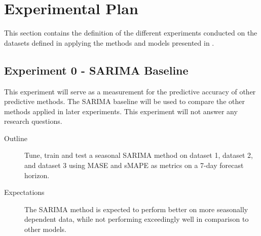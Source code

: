 
\section{Experimental Plan}
\label{section:Results:ExperimentalPlan}

This section contains the definition of the different experiments conducted on the datasets defined in 
applying the methods and models presented in .



\iffalse
  Trying and failing is a major part of research.
  However, to have a chance of success you need a plan driving the experimental research,
  just as you need a plan for your literature search.
  Further, plans are made to be revised and this revision ensures that any further decisions made are in line with the work already completed.

  The plan should include what experiments or series of experiments are planned and what question the individual or set of experiments aim to answer.
  Such questions should be connected to your research questions so that in the evaluation of your results you can discuss the results wrt to the research questions.
\fi


\subsection{Experiment 0 - SARIMA Baseline}
\label{section:results:experimentPlan:Experiment-0}
This experiment will serve as a measurement for the predictive accuracy of other predictive methods.
The SARIMA baseline will be used to compare the other methods applied in later experiments.
This experiment will not answer any research questions.

\begin{description}
  \item[Outline]{
              Tune, train and test a seasonal SARIMA method on dataset 1, dataset 2,
              and dataset 3 using MASE and sMAPE as metrics on a 7-day forecast horizon.
        }
\end{description}

\begin{description}
  \item[Expectations]{
              The SARIMA method is expected to perform better on more seasonally dependent data,
              while not performing exceedingly well in comparison to other models.
        }
\end{description}

